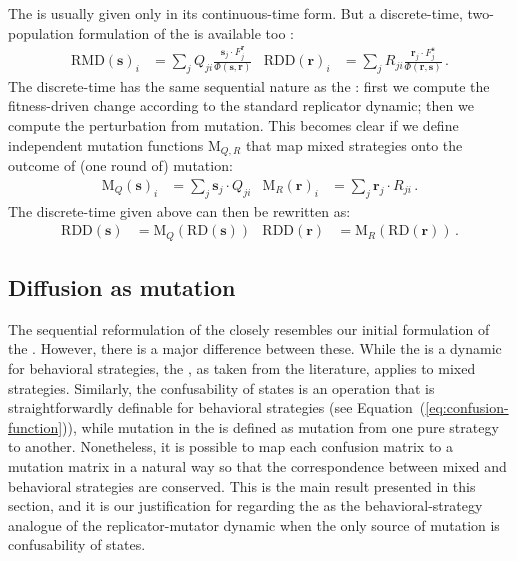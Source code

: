\documentclass[fleqn,reqno,10pt]{article}
\renewcommand{\Smixed}{\ensuremath{\mathrm{\mathbf{s}}}}
\renewcommand{\Rmixed}{\ensuremath{\mathrm{\mathbf{r}}}}
\newcommand{\rmd}{\acro{rmd}} %
\newcommand{\rdd}{\acro{rdd}} %
\newcommand{\RD}{\ensuremath{\mathrm{RD}}} %
\newcommand{\RDD}{\ensuremath{\mathrm{RDD}}} %
\newcommand{\RMD}{\ensuremath{\mathrm{RMD}}} %
\newcommand{\Mutate}{\ensuremath{\mathrm{M}}} %
\begin{document}
The \rmd is usually given only in its continuous-time form. %
But a discrete-time, two-population formulation of the \rmd is
available too \citep[c.f.][97]{PageNowak2002:Unifying-Evolut}:
\begin{align*}
  \RMD(\Smixed)_i & = \sum_{j} Q_{ji} \frac{\Smixed_j \cdot
    F_j^{\Rmixed}}{ \Phi(\Smixed,\Rmixed)} & \RDD(\Rmixed)_i & =
  \sum_{j} R_{ji} \frac{\Rmixed_j \cdot F_j^{\Smixed}}{
    \Phi(\Rmixed,\Smixed)}\,.
\end{align*}
The discrete-time \rmd has the same sequential nature as the \rdd:
first we compute the fitness-driven change according to the standard
replicator dynamic; then we compute the perturbation from
mutation. This becomes clear if we define independent mutation
functions $\Mutate_{Q,R}$ that map mixed strategies onto the outcome
of (one round of) mutation:
\begin{align}
  \label{eq:Mutation}
  \Mutate_Q(\Smixed)_i & =  \sum_j  \Smixed_j \cdot
  Q_{ji} &   \Mutate_R(\Rmixed)_i & =  \sum_{j}  \Rmixed_j \cdot
  R_{ji} \,.
\end{align}
The discrete-time \rmd given above can then be rewritten as:
\begin{align*}
  \RDD(\Smixed) &= \Mutate_Q(\RD(\Smixed)) &   \RDD(\Rmixed) &= \Mutate_R(\RD(\Rmixed))\,. 
\end{align*}



\subsection{Diffusion as mutation}
\label{sec:diffusion-as-special}

The sequential reformulation of the \rmd closely resembles our initial
formulation of the \rdd. However, there is a major difference between
these. While the \rdd is a dynamic for behavioral strategies, the
\rmd, as taken from the literature, applies to mixed
strategies. Similarly, the confusability of states is an operation
that is straightforwardly definable for behavioral strategies (see
Equation~(\ref{eq:confusion-function})), while mutation in the \rmd is
defined as mutation from one pure strategy to another. Nonetheless, it
is possible to map each confusion matrix to a mutation matrix in a
natural way so that the correspondence between mixed and behavioral
strategies are conserved. This is the main result presented in this
section, and it is our justification for regarding the \rdd as the
behavioral-strategy analogue of the replicator-mutator dynamic when
the only source of mutation is confusability of states.
\end{document}
